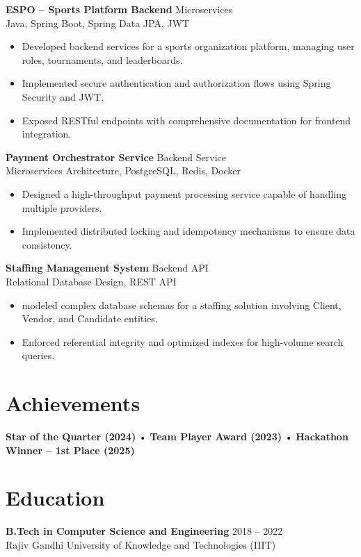 \documentclass[11pt]{article}
\begin{document}
\textbf{ESPO – Sports Platform Backend} \hfill Microservices \\
Java, Spring Boot, Spring Data JPA, JWT
\begin{itemize}
    \item Developed backend services for a sports organization platform, managing user roles, tournaments, and leaderboards.
    \item Implemented secure authentication and authorization flows using Spring Security and JWT.
    \item Exposed RESTful endpoints with comprehensive documentation for frontend integration.
\end{itemize}

\textbf{Payment Orchestrator Service} \hfill Backend Service \\
Microservices Architecture, PostgreSQL, Redis, Docker
\begin{itemize}
    \item Designed a high-throughput payment processing service capable of handling multiple providers.
    \item Implemented distributed locking and idempotency mechanisms to ensure data consistency.
\end{itemize}

\textbf{Staffing Management System} \hfill Backend API \\
Relational Database Design, REST API
\begin{itemize}
    \item modeled complex database schemas for a staffing solution involving Client, Vendor, and Candidate entities.
    \item Enforced referential integrity and optimized indexes for high-volume search queries.
\end{itemize}

\section*{Achievements}
\textbf{Star of the Quarter (2024)} • \textbf{Team Player Award (2023)} • \textbf{Hackathon Winner – 1st Place (2025)}

\section*{Education}
\textbf{B.Tech in Computer Science and Engineering} \hfill 2018 -- 2022 \\
Rajiv Gandhi University of Knowledge and Technologies (IIIT)
\end{document}
